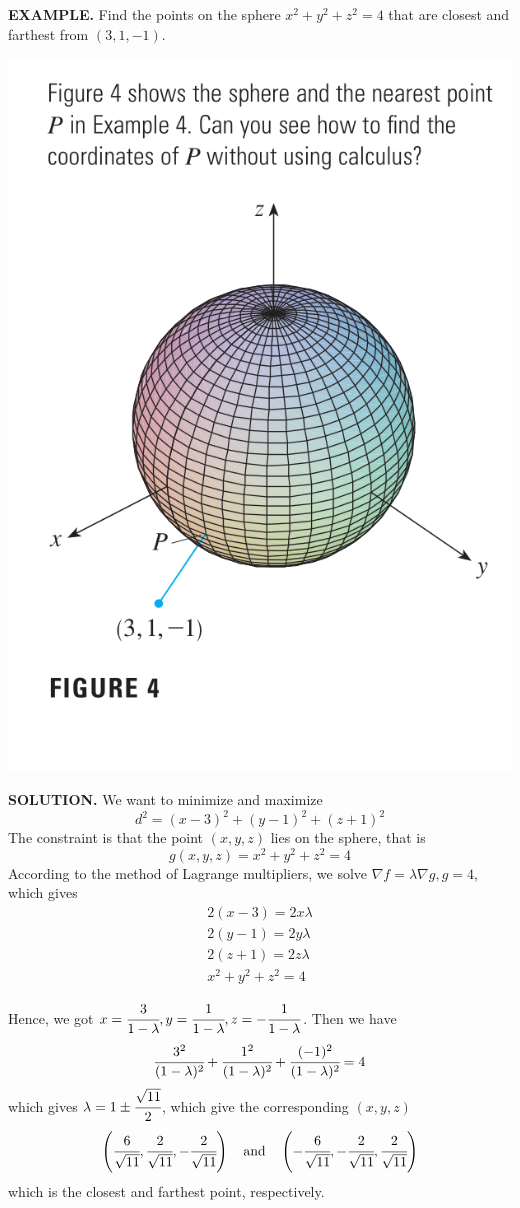 \documentclass{article}
\begin{document}
{\selectfont \textbf{\textcolor{blue5}{ EXAMPLE.}}} Find the points on the sphere $x^2 + y^2 + z^2 = 4 $ that are closest and farthest from $(3,1,-1)$.

\begin{minipage}[]{0.34\linewidth}
  \includegraphics[width = 5 cm]{./images/lagrange4.png}
  
\end{minipage}
\begin{minipage}[]{0.63\linewidth}
{\selectfont \textbf{\textcolor{blue5}{SOLUTION.}}} We want to minimize and maximize 
\[d^2 = (x-3)^2 + (y-1)^2 + (z + 1)^2 \]
The constraint is that the point $(x,y,z)$ lies on the sphere, that is 
\[g(x,y,z) = x^2 + y^2 + z^2 = 4  \]
According to the method of Lagrange multipliers, we solve $\nabla f = \lambda \nabla g, g = 4 $, which gives 
\begin{equation*}
  \begin{split}
    2(x- 3) = 2x \lambda \\ 
    2(y-1) = 2y \lambda \\
    2(z + 1) = 2z \lambda \\ 
    x^2 + y^2 + z^2 = 4     
  \end{split}
\end{equation*}
  
\end{minipage}

Hence, we got $x = \cfrac{3 }{1 - \lambda }, y = \cfrac{1 }{1 - \lambda }, z = - \cfrac{1 }{ 1 - \lambda }   $. Then we have 
\[ \cfrac{3^2 }{(1- \lambda )^2} + \cfrac{1^2 }{(1 - \lambda )^2 } + \cfrac{(-1)^2 }{(1 - \lambda )^2} = 4\]
which gives $\lambda = 1 \pm \cfrac{\sqrt{11 }}{2 }$, which give the corresponding $(x,y,z)$ 
\[\left( \cfrac{6 }{\sqrt{11}}, \cfrac{2 }{ \sqrt{11 }}, - \cfrac{2 }{\sqrt{11 }} \right) \quad \text{and} \quad \left( - \cfrac{6 }{\sqrt{11 }}, - \cfrac{2 }{\sqrt{11 }}, \cfrac{2 }{\sqrt{11 }} \right)\]
which is the closest and farthest point, respectively.
\end{document}
